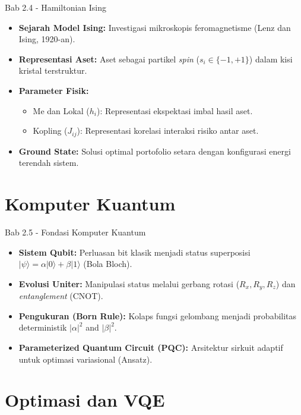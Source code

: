 \documentclass[aspectratio=169]{beamer}
\begin{document}
\begin{frame}{Bab 2.4 - Hamiltonian Ising}
    \begin{itemize}
        \item \textbf{Sejarah Model Ising:} Investigasi mikroskopis feromagnetisme (Lenz  dan   Ising, 1920-an).
        \item \textbf{Representasi Aset:} Aset sebagai partikel \textit{spin} ($s_i \in \{-1, +1\}$) dalam kisi kristal terstruktur.
        \item \textbf{Parameter Fisik:}
        \begin{itemize}
            \item Me dan  Lokal ($h_i$): Representasi ekspektasi imbal hasil aset.
            \item Kopling ($J_{ij}$): Representasi korelasi interaksi risiko antar aset.
        \end{itemize}
        \item \textbf{Ground State:} Solusi optimal portofolio setara dengan konfigurasi energi terendah sistem.
    \end{itemize}
\end{frame}
\section{Komputer Kuantum}

\begin{frame}{Bab 2.5 - Fondasi Komputer Kuantum}
    \begin{itemize}
        \item \textbf{Sistem Qubit:} Perluasan bit klasik menjadi status superposisi $|\psi\rangle = \alpha|0\rangle + \beta|1\rangle$ (Bola Bloch).
        \item \textbf{Evolusi Uniter:} Manipulasi status melalui gerbang rotasi ($R_x, R_y, R_z$) dan  \textit{entanglement} (CNOT).
        \item \textbf{Pengukuran (Born Rule):} Kolaps fungsi gelombang menjadi probabilitas deterministik $|\alpha|^2$ and $|\beta|^2$.
        \item \textbf{Parameterized Quantum Circuit (PQC):} Arsitektur sirkuit adaptif untuk optimasi variasional (Ansatz).
    \end{itemize}
\end{frame}
\section{Optimasi  dan   VQE}
\end{document}
